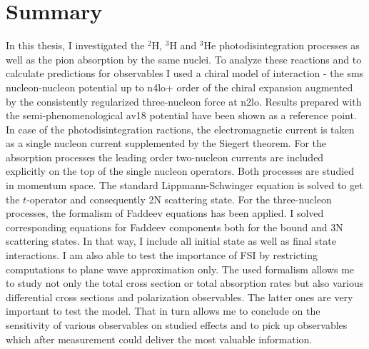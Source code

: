 \chapter{Summary}

In this thesis, I investigated the $^2$H, $^3$H and $^3$He photodisintegration processes
as well as the pion absorption by the same nuclei. To analyze these reactions
and to calculate predictions for observables I used a chiral model of interaction
- the \gls{sms} nucleon-nucleon potential up to \gls{n4lo+} order of the chiral expansion
augmented by the consistently regularized three-nucleon force at \gls{n2lo}.
Results prepared with the semi-phenomenological \gls{av18} potential have been shown as 
a reference point. 
In case of the photodisintegration ractions, the electromagnetic current is taken
as a single nucleon current supplemented by the Siegert theorem.
For the absorption processes the leading order two-nucleon currents are included explicitly
on the top of the single nucleon operators.
Both processes are studied in momentum space.
The standard Lippmann-Schwinger equation is solved to get the $t$-operator and consequently
2N scattering state. For the three-nucleon processes, the formalism of Faddeev equations
has been applied.
I solved corresponding equations for Faddeev components both for the bound and 3N scattering states.
In that way, I include all initial state as well as final state interactions.
I am also able to test the importance of FSI by restricting computations to plane wave approximation only.
The used formalism allows me to study not only the total cross section or total absorption rates
but also various differential cross sections and polarization
observables. The latter ones are very important to test the model.
That in turn allows me to conclude on the sensitivity of various observables on studied effects and to 
pick up observables which after measurement could deliver the most valuable information.

